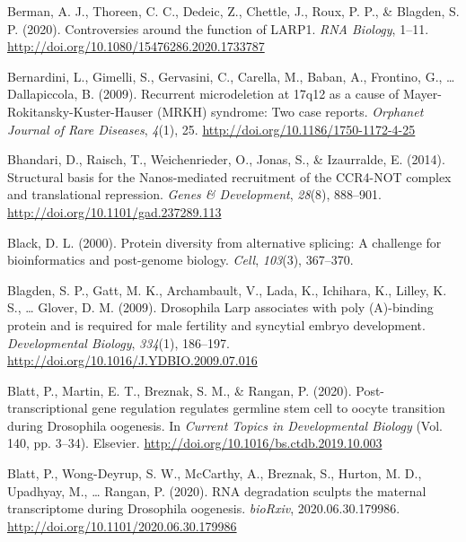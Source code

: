 \documentclass[12pt,twoside]{reedthesis}
\newlength{\cslhangindent}
\newenvironment{cslreferences}%
  {\setlength{\parindent}{0pt}%
  \everypar{\setlength{\hangindent}{\cslhangindent}}\ignorespaces}%
  {\par}
\begin{document}
\begin{cslreferences}
\leavevmode\hypertarget{ref-bermanControversiesFunctionLARP12020}{}%
Berman, A. J., Thoreen, C. C., Dedeic, Z., Chettle, J., Roux, P. P., \& Blagden, S. P. (2020). Controversies around the function of LARP1. \emph{RNA Biology}, 1--11. \url{http://doi.org/10.1080/15476286.2020.1733787}

\leavevmode\hypertarget{ref-bernardiniRecurrentMicrodeletion17q122009}{}%
Bernardini, L., Gimelli, S., Gervasini, C., Carella, M., Baban, A., Frontino, G., \ldots{} Dallapiccola, B. (2009). Recurrent microdeletion at 17q12 as a cause of Mayer-Rokitansky-Kuster-Hauser (MRKH) syndrome: Two case reports. \emph{Orphanet Journal of Rare Diseases}, \emph{4}(1), 25. \url{http://doi.org/10.1186/1750-1172-4-25}

\leavevmode\hypertarget{ref-Bhandari2014h}{}%
Bhandari, D., Raisch, T., Weichenrieder, O., Jonas, S., \& Izaurralde, E. (2014). Structural basis for the Nanos-mediated recruitment of the CCR4-NOT complex and translational repression. \emph{Genes \& Development}, \emph{28}(8), 888--901. \url{http://doi.org/10.1101/gad.237289.113}

\leavevmode\hypertarget{ref-Black2000}{}%
Black, D. L. (2000). Protein diversity from alternative splicing: A challenge for bioinformatics and post-genome biology. \emph{Cell}, \emph{103}(3), 367--370.

\leavevmode\hypertarget{ref-Blagden2009f}{}%
Blagden, S. P., Gatt, M. K., Archambault, V., Lada, K., Ichihara, K., Lilley, K. S., \ldots{} Glover, D. M. (2009). Drosophila Larp associates with poly (A)-binding protein and is required for male fertility and syncytial embryo development. \emph{Developmental Biology}, \emph{334}(1), 186--197. \url{http://doi.org/10.1016/J.YDBIO.2009.07.016}

\leavevmode\hypertarget{ref-blattPosttranscriptionalGeneRegulation2020}{}%
Blatt, P., Martin, E. T., Breznak, S. M., \& Rangan, P. (2020). Post-transcriptional gene regulation regulates germline stem cell to oocyte transition during Drosophila oogenesis. In \emph{Current Topics in Developmental Biology} (Vol. 140, pp. 3--34). Elsevier. \url{http://doi.org/10.1016/bs.ctdb.2019.10.003}

\leavevmode\hypertarget{ref-blattRNADegradationSculpts2020}{}%
Blatt, P., Wong-Deyrup, S. W., McCarthy, A., Breznak, S., Hurton, M. D., Upadhyay, M., \ldots{} Rangan, P. (2020). RNA degradation sculpts the maternal transcriptome during Drosophila oogenesis. \emph{bioRxiv}, 2020.06.30.179986. \url{http://doi.org/10.1101/2020.06.30.179986}


\end{cslreferences}
\end{document}
